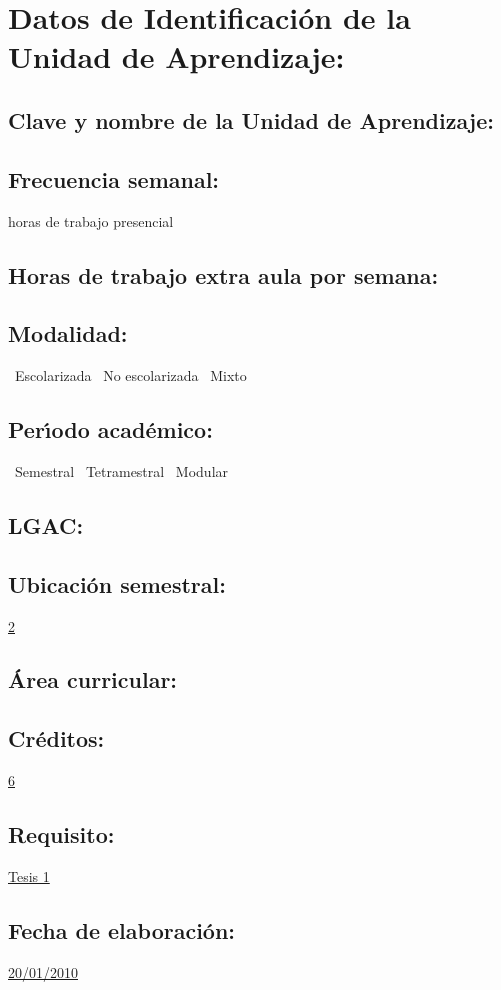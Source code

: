 \documentclass[10 pt]{article}
\begin{document}


\section{Datos de Identificaci\'{o}n de la Unidad de Aprendizaje:}
\subsection{Clave y nombre de la Unidad de Aprendizaje:} 
\subsection{Frecuencia semanal:} horas de trabajo presencial 
\subsection{Horas de trabajo extra aula por semana:} 
\subsection{Modalidad:} \yes~Escolarizada \no~No escolarizada \no~Mixto
\subsection{Per\'{\i}odo acad\'{e}mico:} \yes~Semestral
\no~Tetramestral \no~Modular
\subsection{LGAC:} \underline{\odsi}
\subsection{Ubicaci\'{o}n semestral:} \underline{2}
\subsection{\'{A}rea curricular:} \underline{\pi}
\subsection{Cr\'{e}ditos:} \underline{6}
\subsection{Requisito:} \underline{Tesis 1}
\subsection{Fecha de elaboraci\'{o}n:} \underline{20/01/2010}
\end{document}
